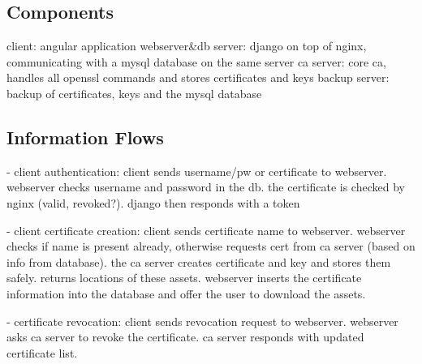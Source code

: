 \documentclass[english]{article}
\begin{document}


\subsection{Components}

  
  client: angular application
  webserver\&db server: django on top of nginx, communicating with a mysql database on the same server
  ca server: core ca, handles all openssl commands and stores certificates and keys
  backup server: backup of certificates, keys and the mysql database

\subsection{Information Flows}

- client authentication: client sends username/pw or certificate to webserver. webserver checks username and password in the db. the certificate is checked by nginx (valid, revoked?). django then responds with a token

- client certificate creation: client sends certificate name to webserver. webserver checks if name is present already, otherwise requests cert from ca server (based on info from database). the ca server creates certificate and key and stores them safely. returns locations of these assets. webserver inserts the certificate information into the database and offer the user to download the assets.

- certificate revocation: client sends revocation request to webserver. webserver asks ca server to revoke the certificate. ca server responds with updated certificate list.

\end{document}

